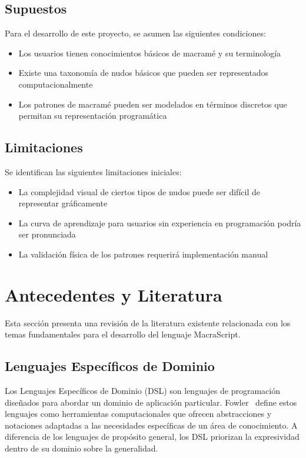 \documentclass[12pt,a4paper]{report}
\begin{document}
\section{Supuestos}
Para el desarrollo de este proyecto, se asumen las siguientes condiciones:

\begin{itemize}
    \item Los usuarios tienen conocimientos básicos de macramé y su terminología
    \item Existe una taxonomía de nudos básicos que pueden ser representados computacionalmente
    \item Los patrones de macramé pueden ser modelados en términos discretos que permitan su representación programática
\end{itemize}

\section{Limitaciones}
Se identifican las siguientes limitaciones iniciales:

\begin{itemize}
    \item La complejidad visual de ciertos tipos de nudos puede ser difícil de representar gráficamente
    \item La curva de aprendizaje para usuarios sin experiencia en programación podría ser pronunciada
    \item La validación física de los patrones requerirá implementación manual
\end{itemize}

\chapter{Antecedentes y Literatura}

Esta sección presenta una revisión de la literatura existente relacionada con los temas fundamentales para el desarrollo del lenguaje MacraScript.

\section{Lenguajes Específicos de Dominio}
Los Lenguajes Específicos de Dominio (DSL) son lenguajes de programación diseñados para abordar un dominio de aplicación particular. Fowler~\cite{fowler2010} define estos lenguajes como herramientas computacionales que ofrecen abstracciones y notaciones adaptadas a las necesidades específicas de un área de conocimiento. A diferencia de los lenguajes de propósito general, los DSL priorizan la expresividad dentro de su dominio sobre la generalidad.
\end{document}

